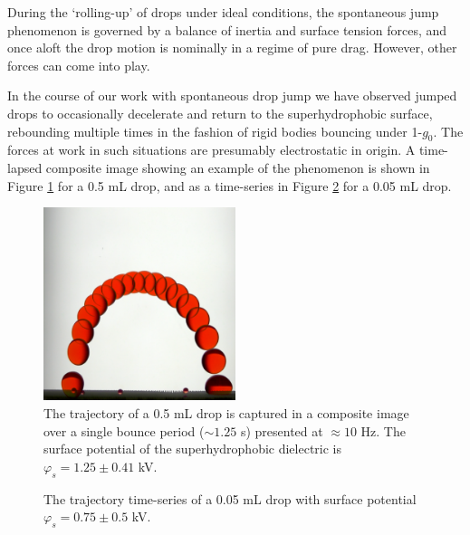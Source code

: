 \documentclass[aip,reprint, floatfix]{revtex4-1}
\begin{document}
During the `rolling-up' of drops under ideal conditions, the spontaneous jump phenomenon is governed by a balance of inertia and surface tension forces, and once aloft the drop motion is nominally in a regime of pure drag. However, other forces can come into play. 

In the course of our work with spontaneous drop jump we have observed jumped drops to occasionally decelerate and return to the superhydrophobic surface, rebounding multiple times in the fashion of rigid bodies bouncing under 1-$g_0$. The forces at work in such situations are presumably electrostatic in origin. A time-lapsed composite image showing an example of the phenomenon is shown in Figure \ref{fig:bounce} for a 0.5 mL drop, and as a time-series in Figure \ref{fig:bounce_time} for a 0.05 mL drop.
\begin{figure}[htb]
\centering
\includegraphics[width=0.5\textwidth]{bounce}
\caption{The trajectory of a 0.5 mL drop is captured in a composite image over a single bounce period ($\sim 1.25$ s) presented at $\approx 10$ Hz. The surface potential of the superhydrophobic dielectric is $\varphi_s = 1.25 \pm 0.41$ kV. \label{fig:bounce}}
\end{figure}

\begin{figure}[htb]
\centering
\resizebox{0.5\textwidth}{!}{}
\caption{The trajectory time-series of a 0.05 mL drop with surface potential $\varphi_s = 0.75 \pm 0.5$ kV. \label{fig:bounce_time}}
\end{figure}
\end{document}
